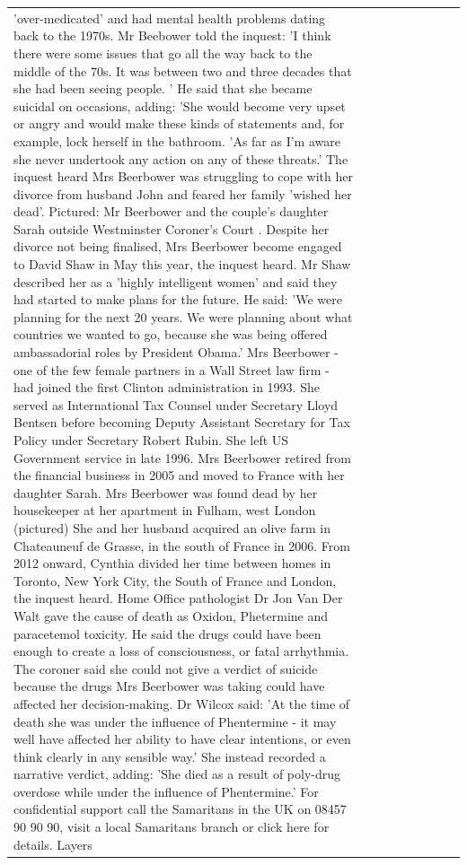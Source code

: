 \begin{table}[H]
\begin{tabular}{lllrlllll}
'over-medicated' and had mental health problems dating back to the 1970s. Mr Beebower told the inquest: 'I think there were some issues that go all the way back to the middle of the 70s. It was between two and three decades that she had been seeing people. ' He said that she became suicidal on occasions, adding: 'She would become very upset or angry and would make these kinds of statements and, for example, lock herself in the bathroom. 'As far as I'm aware she never undertook any action on any of these threats.' The inquest heard Mrs Beerbower was struggling to cope with her divorce from husband John and feared her family 'wished her dead'. Pictured: Mr Beerbower and the couple's daughter Sarah outside Westminster Coroner's Court . Despite her divorce not being finalised, Mrs Beerbower become engaged to David Shaw in May this year, the inquest heard. Mr Shaw described her as a 'highly intelligent women' and said they had started to make plans for the future. He said: 'We were planning for the next 20 years. We were planning about what countries we wanted to go, because she was being offered ambassadorial roles by President Obama.' Mrs Beerbower - one of the few female partners in a Wall Street law firm - had joined the first Clinton administration in 1993. She served as International Tax Counsel under Secretary Lloyd Bentsen before becoming Deputy Assistant Secretary for Tax Policy under Secretary Robert Rubin. She left US Government service in late 1996. Mrs Beerbower retired from the financial business in 2005 and moved to France with her daughter Sarah. Mrs Beerbower was found dead by her housekeeper at her apartment in Fulham, west London (pictured) She and her husband acquired an olive farm in Chateauneuf de Grasse, in the south of France in 2006. From 2012 onward, Cynthia divided her time between homes in Toronto, New York City, the South of France and London, the inquest heard. Home Office pathologist Dr Jon Van Der Walt gave the cause of death as Oxidon, Phetermine and paracetemol toxicity. He said the drugs could have been enough to create a loss of consciousness, or fatal arrhythmia. The coroner said she could not give a verdict of suicide because the drugs Mrs Beerbower was taking could have affected her decision-making. Dr Wilcox said: 'At the time of death she was under the influence of Phentermine - it may well have affected her ability to have clear intentions, or even think clearly in any sensible way.' She instead recorded a narrative verdict, adding: 'She died as a result of poly-drug overdose while under the influence of Phentermine.' For confidential support call the Samaritans in the UK on 08457 90 90 90, visit a local Samaritans branch or click here for details. Layers \\

\end{tabular}
\end{table}
